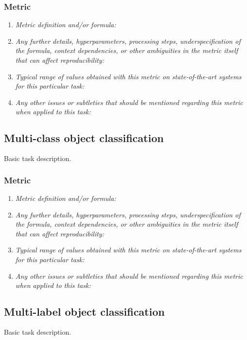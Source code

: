 \documentclass[a4paper,11pt]{article}
\begin{document}
    \subsubsection{Metric}
        \begin{enumerate}[label=\alph*.]
            \item \textit{Metric definition and/or formula:}
            \bigskip
            \item \textit{Any further details, hyperparameters, processing steps, underspecification of the formula, context dependencies, or other ambiguities in the metric itself that can affect reproducibility:}
            \bigskip
            \item \textit{Typical range of values obtained with this metric on state-of-the-art systems for this particular task:}
            \bigskip
            \item \textit{Any other issues or subtleties that should be mentioned regarding this metric when applied to this task:}
            \bigskip
        \end{enumerate}

\subsection{Multi-class object classification}
    Basic task description.
    \subsubsection{Metric}
        \begin{enumerate}[label=\alph*.]
            \item \textit{Metric definition and/or formula:}
            \bigskip
            \item \textit{Any further details, hyperparameters, processing steps, underspecification of the formula, context dependencies, or other ambiguities in the metric itself that can affect reproducibility:}
            \bigskip
            \item \textit{Typical range of values obtained with this metric on state-of-the-art systems for this particular task:}
            \bigskip
            \item \textit{Any other issues or subtleties that should be mentioned regarding this metric when applied to this task:}
            \bigskip
        \end{enumerate}

\subsection{Multi-label object classification}
    Basic task description.
\end{document}
